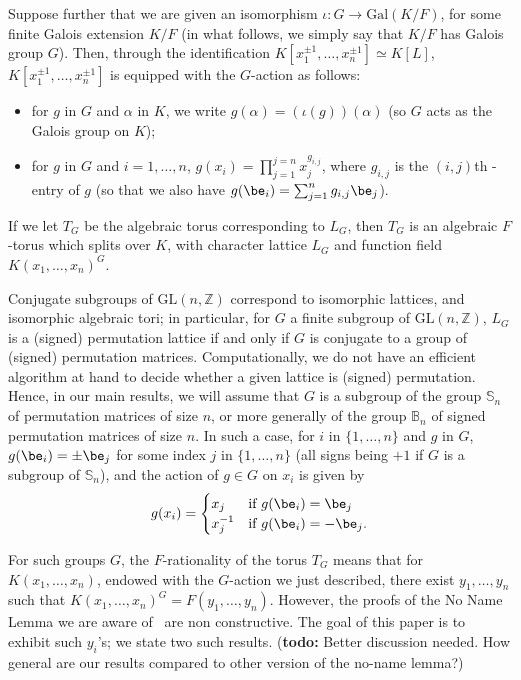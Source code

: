 \documentclass[12pt]{article}
\theoremstyle{plain}
\def\todo#1{(\textbf{todo:} #1)}
\newcommand{\Z}{\ensuremath{\mathbb{Z}}}
\begin{document}
Suppose further that we are given an isomorphism $\iota: G \to
\mathrm{Gal}(K/F)$, for some finite Galois extension $K/F$ (in what
follows, we simply say that $K/F$ has Galois group $G$). Then, through
the identification $K[x_1^{\pm 1}, \ldots , x_n^{\pm 1}]\simeq K[L]$,
$K[x_1^{\pm 1}, \ldots , x_n^{\pm 1}]$ is equipped with the $G$-action
as follows:
\begin{itemize}
\item for $g$ in $G$ and $\alpha$ in $K$, we write
  $g(\alpha)=(\iota(g))(\alpha)$ (so $G$ acts as the Galois group on
  $K$);
\item for $g$ in $G$ and $i=1,\dots,n$, $g(x_i) = \prod_{j=1}^{j=n}
  x_j^{g_{i,j}}$, where $g_{i,j}$ is the $(i,j)$th -entry of $g$
 (so that we also have $g(\be_i) =
  \sum_{j=1}^{n} g_{i,j}\be_j$).
\end{itemize}
If we let $T_G$ be the algebraic torus corresponding to $L_G$, then
$T_G$ is an algebraic $F$-torus which splits over $K$, with character
lattice $L_G$ and function field $K(x_1,\dots,x_n)^G$.

Conjugate subgroups of $\mathrm{GL}(n,\Z)$ correspond to isomorphic
lattices, and isomorphic algebraic tori; in particular, for $G$ a
finite subgroup of $\mathrm{GL}(n,\mathbb{Z})$, $L_G$ is a (signed)
permutation lattice if and only if $G$ is conjugate to a group of
(signed) permutation matrices.  Computationally, we do not have an
efficient algorithm at hand to decide whether a given lattice is
(signed) permutation. Hence, in our main results, we will assume that
$G$ is a subgroup of the group $\mathbb{S}_n$ of permutation matrices
of size $n$, or more generally of the group $\mathbb{B}_n$ of signed
permutation matrices of size $n$.  In such a case, for $i$ in
$\{1,\dots,n\}$ and $g$ in $G$, $g(\be_i)=\pm \be_j$ for some index
$j$ in $\{1,\dots,n\}$ (all signs being $+1$ if $G$ is a subgroup of
$\mathbb{S}_n$), and the action of $g \in G$ on $x_i$ is given
by $$g(x_i) = \begin{cases} x_j & \text{if~} g(\be_i) = \be_j
  \\ x^{-1}_j & \text{if~} g(\be_i) = -\be_j. \end{cases}$$

For such groups $G$, the $F$-rationality of the torus $T_{G}$ means
that for $K(x_1,\dots,x_n)$, endowed with the $G$-action we just
described, there exist $y_1,\dots,y_n$ such that
$K(x_1,\dots,x_n)^G=F(y_1,\dots,y_n)$. However, the proofs of the
No Name Lemma we are aware of~\cite{xxx} are non constructive.  The
goal of this paper is to exhibit such $y_i$'s; we state two such
results. \todo{Better discussion needed. How general are our results
compared to other version of the no-name lemma?}
\end{document}

